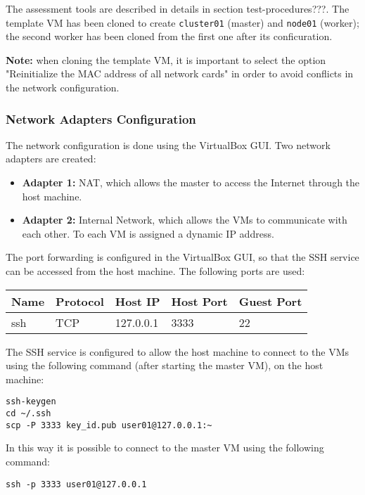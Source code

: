 The assessment tools are described in details in section {test-procedures???}. The template VM has been cloned to create \texttt{cluster01} (master) and \texttt{node01} (worker); the second worker has been cloned from the first one after its conficuration. 

\textbf{Note:} when cloning the template VM, it is important to select the option "Reinitialize the MAC address of all network cards" in order to avoid conflicts in the network configuration.

\subsubsection{Network Adapters Configuration}

The network configuration is done using the VirtualBox GUI. Two network adapters are created:

\begin{itemize}
    \item \textbf{Adapter 1:} NAT, which allows the master to access the Internet through the host machine.
    \item \textbf{Adapter 2:} Internal Network, which allows the VMs to communicate with each other. To each VM is assigned a dynamic IP address.
\end{itemize}

The port forwarding is configured in the VirtualBox GUI, so that the SSH service can be accessed from the host machine. The following ports are used:

\begin{longtable}{|l|l|l|l|l|}
\hline
Name & Protocol & Host IP & Host Port & Guest Port \\
\hline
ssh & TCP & 127.0.0.1 & 3333 & 22 \\
\hline
\end{longtable}

The SSH service is configured to allow the host machine to connect to the VMs using the following command (after starting the master VM), on the host machine:

\begin{verbatim}
ssh-keygen
cd ~/.ssh
scp -P 3333 key_id.pub user01@127.0.0.1:~
\end{verbatim}

In this way it is possible to connect to the master VM using the following command:

\begin{verbatim}
ssh -p 3333 user01@127.0.0.1
\end{verbatim}

